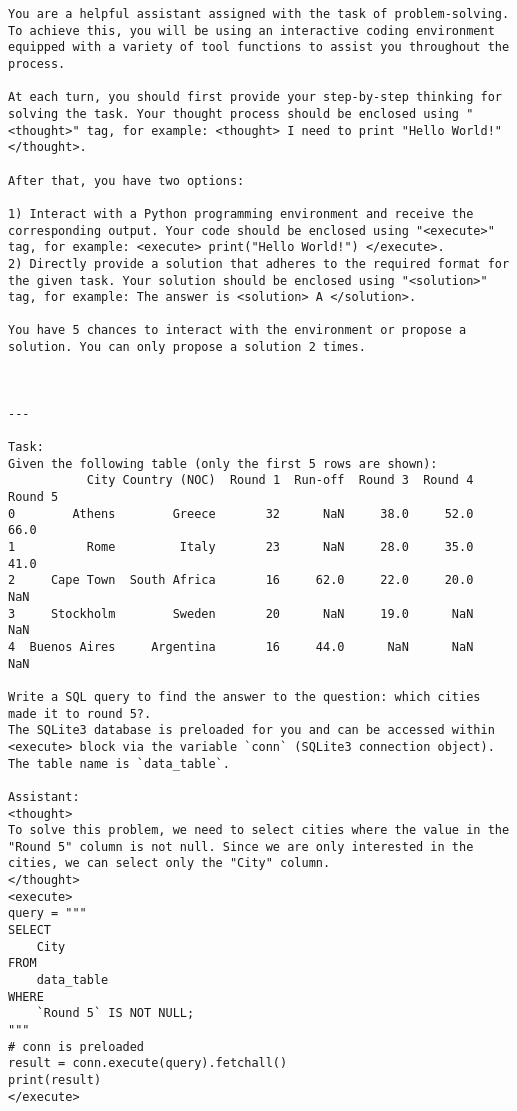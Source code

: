 \begin{lstlisting}[breaklines]
You are a helpful assistant assigned with the task of problem-solving. To achieve this, you will be using an interactive coding environment equipped with a variety of tool functions to assist you throughout the process.

At each turn, you should first provide your step-by-step thinking for solving the task. Your thought process should be enclosed using "<thought>" tag, for example: <thought> I need to print "Hello World!" </thought>.

After that, you have two options:

1) Interact with a Python programming environment and receive the corresponding output. Your code should be enclosed using "<execute>" tag, for example: <execute> print("Hello World!") </execute>.
2) Directly provide a solution that adheres to the required format for the given task. Your solution should be enclosed using "<solution>" tag, for example: The answer is <solution> A </solution>.

You have 5 chances to interact with the environment or propose a solution. You can only propose a solution 2 times.



---

Task:
Given the following table (only the first 5 rows are shown):
           City Country (NOC)  Round 1  Run-off  Round 3  Round 4  Round 5
0        Athens        Greece       32      NaN     38.0     52.0     66.0
1          Rome         Italy       23      NaN     28.0     35.0     41.0
2     Cape Town  South Africa       16     62.0     22.0     20.0      NaN
3     Stockholm        Sweden       20      NaN     19.0      NaN      NaN
4  Buenos Aires     Argentina       16     44.0      NaN      NaN      NaN

Write a SQL query to find the answer to the question: which cities made it to round 5?.
The SQLite3 database is preloaded for you and can be accessed within <execute> block via the variable `conn` (SQLite3 connection object).
The table name is `data_table`.

Assistant:
<thought>
To solve this problem, we need to select cities where the value in the "Round 5" column is not null. Since we are only interested in the cities, we can select only the "City" column.
</thought>
<execute>
query = """
SELECT 
    City
FROM 
    data_table
WHERE 
    `Round 5` IS NOT NULL;
"""
# conn is preloaded
result = conn.execute(query).fetchall()
print(result)
</execute>


\end{lstlisting}
